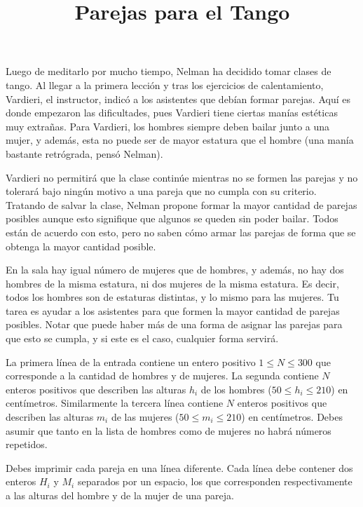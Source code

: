 \documentclass{oci}
\title{Parejas para el Tango}
\begin{document}
\begin{problemDescription}
Luego de meditarlo por mucho tiempo, Nelman ha decidido tomar clases de tango.
Al llegar a la primera lección y tras los ejercicios de calentamiento, Vardieri, el instructor, indicó a los asistentes que debían formar parejas.
Aquí es donde empezaron las dificultades, pues Vardieri tiene ciertas manías estéticas muy extrañas.
Para Vardieri, los hombres siempre deben bailar junto a una mujer, y además, esta no puede ser de mayor estatura que el hombre (una manía bastante retrógrada, pensó Nelman).

Vardieri no permitirá que la clase continúe mientras no se formen las parejas y no tolerará bajo ningún motivo a una pareja que no cumpla con su criterio.
Tratando de salvar la clase, Nelman propone formar la mayor cantidad de parejas posibles aunque esto signifique que algunos se queden sin poder bailar.
Todos están de acuerdo con esto, pero no saben cómo armar las parejas de forma que se obtenga la mayor cantidad posible.

En la sala hay igual número de mujeres que de hombres, y además, no hay dos hombres de la misma estatura, ni dos mujeres de la misma estatura.
Es decir, todos los hombres son de estaturas distintas, y lo mismo para las mujeres.
Tu tarea es ayudar a los asistentes para que formen la mayor cantidad de parejas posibles.
Notar que puede haber más de una forma de asignar las parejas para que esto se cumpla, y si este es el caso, cualquier forma servirá.

\end{problemDescription}

\begin{inputDescription}
La primera línea de la entrada contiene un entero positivo $1 \leq N \leq 300$ que corresponde a la cantidad de hombres y de mujeres.
La segunda contiene $N$ enteros positivos que describen las alturas $h_i$ de los hombres ($50 \leq h_i \leq 210$) en centímetros.
Similarmente la tercera línea contiene $N$ enteros positivos que describen las alturas $m_i$ de las mujeres ($50 \le m_i \le 210$) en centímetros.
Debes asumir que tanto en la lista de hombres como de mujeres no habrá números repetidos.
\end{inputDescription}

\begin{outputDescription}
Debes imprimir cada pareja en una línea diferente.
Cada línea debe contener dos enteros $H_i$ y $M_i$ separados por un espacio, los que corresponden respectivamente a las alturas del hombre y de la mujer de una pareja.
\end{outputDescription}
\end{document}
